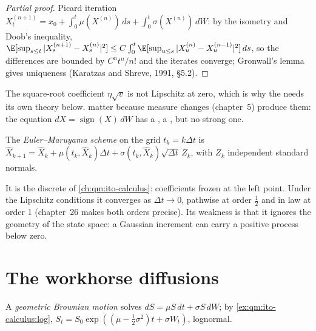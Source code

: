 \begin{proof}[Partial proof]
Picard iteration $X^{(n+1)}_t = x_0 + \int_0^t\mu(X^{(n)})\,ds + \int_0^t\sigma(X^{(n)})\,dW$: by the
isometry and Doob's inequality, $\E[\sup_{s\le t}|X^{(n+1)}_s - X^{(n)}_s|^2] \le C\int_0^t
\E[\sup_{u\le s}|X^{(n)}_u - X^{(n-1)}_u|^2]\,ds$, so the differences are bounded by $C^nt^n/n!$
and the iterates converge; Gronwall's lemma gives uniqueness (Karatzas and Shreve, 1991, §5.2).
\end{proof}

The square-root coefficient $\eta\sqrt v$ is not Lipschitz at zero, which is why the
 needs its own theory below.  matter because measure changes
(chapter~5) produce them: the equation $dX = \operatorname{sign}(X)\,dW$ has a , a
, but no strong one.

\begin{definition}\label{def:qm:stochastic-differential-equations:euler}
The \emph{Euler--Maruyama scheme} on the grid $t_k = k\Delta t$ is
$\hat X_{k+1} = \hat X_k + \mu(t_k, \hat X_k)\Delta t + \sigma(t_k, \hat X_k)\sqrt{\Delta t}\,Z_k$, with $Z_k$
independent standard normals.
\end{definition}

It is the discrete  of \cref{ch:qm:ito-calculus}: coefficients frozen at the left
point. Under the Lipschitz conditions it converges as $\Delta t \to 0$, pathwise at order
$\tfrac12$ and in law at order 1 (chapter~26 makes both orders precise). Its weakness is that
it ignores the geometry of the state space: a Gaussian increment can carry a positive process
below zero.

\section{The workhorse diffusions}

\begin{definition}\label{def:qm:stochastic-differential-equations:gbm}
A \emph{geometric Brownian motion} solves $dS = \mu S\,dt + \sigma
S\,dW$; by \cref{ex:qm:ito-calculus:log}, $S_t = S_0\exp((\mu - \tfrac12\sigma^2)t + \sigma W_t)$, lognormal.
\end{definition}

